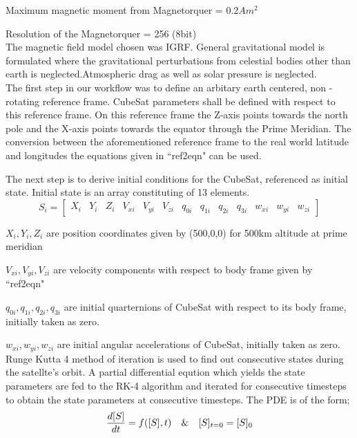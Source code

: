 \documentclass[11pt]{report}
\begin{document}
	\noindent Maximum magnetic moment from Magnetorquer = $0.2Am^2$
	
	\noindent Resolution of the Magnetorquer = 256 (8bit)\\
	
	The magnetic field model chosen was IGRF. General gravitational model is formulated where the gravitational perturbations from celestial bodies other than earth is neglected.Atmospheric drag as well as solar pressure is neglected.\\
	
	The first step in our workflow was to define an arbitary earth centered, non - rotating reference frame. CubeSat parameters shall be defined with respect to this reference frame. On this reference frame the Z-axis points towards the north pole and the X-axis points towards the equator through the Prime Meridian. The conversion between the aforementioned reference frame to the real world latitude and longitudes the equations given in ``ref2eqn" can be used.
	
	The next step is to derive initial conditions for the CubeSat, referenced as initial state. Initial state is an array constituting of 13 elements. $$S_i = [\begin{array}{lllllllllllll}
		X_i & Y_i & Z_i & V_{xi} & V_{yi} & V_{zi} & q_{0i} & q_{1i} & q_{2i} & q_{3i} & w_{xi} & w_{yi} & w_{zi}
	\end{array}]$$
	
	$X_i,Y_i,Z_i$ are position coordinates given by (500,0,0) for 500km altitude at prime meridian
	
	$V_{xi},V_{yi},V_{zi}$ are velocity components with respect to body frame given by ``ref2eqn"
	
	$q_{0i},q_{1i},q_{2i},q_{3i}$ are initial quarternions of CubeSat with respect to its body frame, initially taken as zero.
	
	$w_{xi},w_{yi},w_{zi}$ are initial angular accelerations of CubeSat, initially taken as zero.\\
	
	Runge Kutta 4 method of iteration is used to find out consecutive states during the satellte's orbit. A partial differential eqution which yields the state parameters are fed to the RK-4 algorithm and iterated for consecutive timesteps to obtain the state parameters at consecutive timesteps. The PDE is of the form;$$\frac{d[S]}{dt} = f([S],t) \text{\hspace{10pt}\&\hspace{10pt}} [S]_{t=0} = [S]_0$$
	
\end{document}
